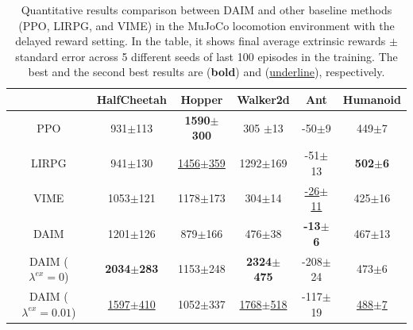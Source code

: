\begin{table}[h!]
{\begin{tabular}{c|ccccc}
     \cmidrule(lr){2-6}
      & HalfCheetah & Hopper & Walker2d & Ant & Humanoid \\
    \midrule
    PPO & 931$\pm$113 & \textbf{1590$\pm$300} & 305 $\pm$13 & {-50$\pm$9} & 449$\pm$7 \\
    LIRPG & 941$\pm$130 & \underline{1456$\pm$359}& 1292$\pm$169 & -51$\pm$13 & \textbf{502$\pm$6}\\
    VIME  & 1053$\pm$121 & 1178$\pm$173 & 304$\pm$14 & \underline{-26$\pm$11} & 425$\pm$16 \\
    \midrule
    DAIM & 1201$\pm$126& 879$\pm$166 & 476$\pm$38 & \textbf{-13$\pm$6} & 467$\pm$13\\
    DAIM ($\lambda^{ex}=0$) & \textbf{2034$\pm$283} & 1153$\pm$248 & \textbf{2324$\pm$475} & -208$\pm$24 & 473$\pm$6\\
    DAIM ($\lambda^{ex}=0.01$) & \underline{1597$\pm$410} & 1052$\pm$337 & \underline{1768$\pm$518}& -117$\pm$19 & \underline{488$\pm$7}\\
    \bottomrule
    \end{tabular}}
    \caption[Average reward of DAIM in the MuJoCo environments with the delayed reward settings in the final epoch during training.]{Quantitative results comparison between DAIM and other baseline methods (PPO, LIRPG, and VIME) in the MuJoCo locomotion environment with the delayed reward setting. In the table, it shows final average extrinsic rewards $\pm$ standard error across 5 different seeds of last 100 episodes in the training. The best and the second best results are (\textbf{bold}) and (\underline{underline}), respectively.}
    \label{tab:delay}
\end{table}

